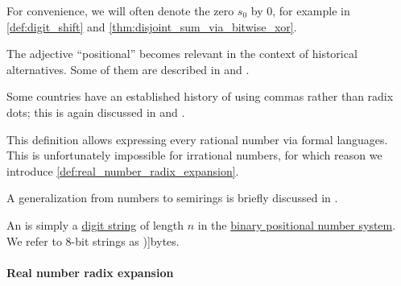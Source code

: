 \begin{comments}
  \item For convenience, we will often denote the zero \( s_0 \) by \( 0 \), for example in \cref{def:digit_shift} and \cref{thm:disjoint_sum_via_bitwise_xor}.

  \item The adjective \enquote{positional} becomes relevant in the context of historical alternatives. Some of them are described in \cite{БашмаковаЮшкевич1951ПроисхождениеСистемСчисления} and \cite[\S 4.1]{Knuth1997ArtVol2}.

  \item Some countries have an established history of using commas rather than radix dots; this is again discussed in \cite{БашмаковаЮшкевич1951ПроисхождениеСистемСчисления} and \cite[\S 4.1]{Knuth1997ArtVol2}.

  \item This definition allows expressing every rational number via formal languages. This is unfortunately impossible for irrational numbers, for which reason we introduce \cref{def:real_number_radix_expansion}.

  \item A generalization from numbers to semirings is briefly discussed in \cite[example 1.15]{Golan1999Semirings}.
\end{comments}

\begin{definition}\label{def:bit_string}\mimprovised
  An  is simply a \hyperref[def:positional_number_system]{digit string} of length \( n \) in the \hyperref[def:positional_number_system/binary]{binary positional number system}. We refer to \( 8 \)-bit strings as \term[en=byte (\cite[50]{Cohen1981Endianness})]{bytes}.
\end{definition}

\paragraph{Real number radix expansion}

